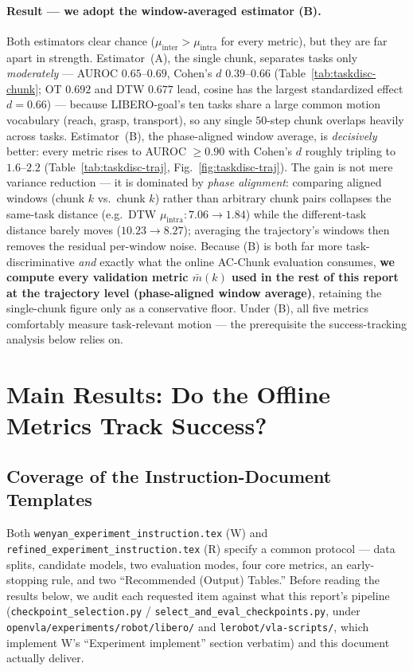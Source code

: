 \documentclass[11pt]{article}
\begin{document}
\paragraph{Result --- we adopt the window-averaged estimator (B).} Both estimators clear chance
($\mu_{\text{inter}}>\mu_{\text{intra}}$ for every metric), but they are far apart in strength.
Estimator~(A), the single chunk, separates tasks only \emph{moderately} --- AUROC $0.65$--$0.69$,
Cohen's $d$ $0.39$--$0.66$ (Table~\ref{tab:taskdisc-chunk}; OT $0.692$ and DTW $0.677$ lead, cosine has
the largest standardized effect $d{=}0.66$) --- because LIBERO-goal's ten tasks share a large common
motion vocabulary (reach, grasp, transport), so any single $50$-step chunk overlaps heavily across tasks.
Estimator~(B), the phase-aligned window average, is \emph{decisively} better: every metric rises to
AUROC $\ge0.90$ with Cohen's $d$ roughly tripling to $1.6$--$2.2$ (Table~\ref{tab:taskdisc-traj},
Fig.~\ref{fig:taskdisc-traj}). The gain is not mere variance reduction --- it is dominated by
\emph{phase alignment}: comparing aligned windows (chunk $k$ vs.\ chunk $k$) rather than arbitrary chunk
pairs collapses the same-task distance (e.g.\ DTW $\mu_{\text{intra}}: 7.06\!\to\!1.84$) while the
different-task distance barely moves ($10.23\!\to\!8.27$); averaging the trajectory's windows then
removes the residual per-window noise. Because (B) is both far more task-discriminative \emph{and}
exactly what the online AC-Chunk evaluation consumes, \textbf{we compute every validation metric
$\bar m(k)$ used in the rest of this report at the trajectory level (phase-aligned window average)},
retaining the single-chunk figure only as a conservative floor. Under (B), all five metrics comfortably
measure task-relevant motion --- the prerequisite the success-tracking analysis below relies on.

\section{Main Results: Do the Offline Metrics Track Success?}

\subsection*{Coverage of the Instruction-Document Templates}
\label{sec:coverage}

Both \texttt{wenyan\_experiment\_instruction.tex} (W) and \texttt{refined\_experiment\_instruction.tex}
(R) specify a common protocol --- data splits, candidate models, two evaluation modes, four core
metrics, an early-stopping rule, and two ``Recommended (Output) Tables.'' Before reading the results
below, we audit each requested item against what this report's pipeline
(\texttt{checkpoint\_selection.py} / \texttt{select\_and\_eval\_checkpoints.py}, under
\texttt{openvla/experiments/robot/libero/} and \texttt{lerobot/vla-scripts/}, which implement W's
``Experiment implement'' section verbatim) and this document actually deliver.
\end{document}
